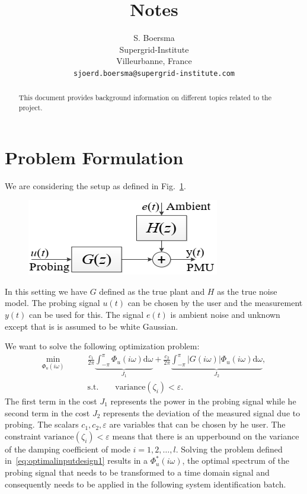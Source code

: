 \documentclass{article}
\title{Notes}
\author{
  S. Boersma\\ %
  Supergrid-Institute\\
  Villeurbanne, France \\
  \texttt{sjoerd.boersma@supergrid-institute.com} \\
}
\begin{document}
\maketitle

\begin{abstract}
	This document provides background information on different topics related to the project.
\end{abstract}



\section{Problem Formulation}
We are considering the setup as defined in Fig.~\ref{fig:setup}.


\begin{figure}[h]
	\centering
	\includegraphics[width=.5\linewidth]{Images/setup}
	\label{fig:setup}
\end{figure}

In this setting we have $G$ defined as the true plant and $H$ as the true noise model. The probing signal $u(t)$ can be chosen by the user and the measurement $y(t)$ can be used for this. The signal $e(t)$ is ambient noise and unknown except that is is assumed to be white Gaussian.   

We want to solve the following optimization problem:
\begin{equation}
\begin{aligned}
\min_{\Phi_u(i\omega)} \qquad & \frac{c_1}{2\pi} \underbrace{\int_{-\pi}^{\pi} \Phi_u(i\omega) \text{d}\omega}_{J_1} + \frac{c_2}{2\pi} \underbrace{\int_{-\pi}^{\pi} |G(i\omega)| \Phi_u(i\omega) \text{d}\omega}_{J_2}, \\
& \text{s.t.} \qquad \text{variance}(\zeta_i) < \varepsilon.
\label{eq:optimalinputdesign1}
\end{aligned}
\end{equation}
The first term in the cost $J_1$ represents the power in the probing signal while he second term in the cost $J_2$ represents the deviation of the measured signal due to probing. The scalars $c_1,c_2,\varepsilon$ are variables that can be chosen by he user. The constraint $\text{variance}(\zeta_i) < \varepsilon$ means that there is an upperbound on the variance of the damping coefficient of mode $i=1,2,\ldots,l$. Solving the problem defined in~\eqref{eq:optimalinputdesign1} results in a $\Phi^*_u(i\omega)$, the optimal spectrum of the probing signal that needs to be transformed to a time domain signal and consequently needs to be applied in the following system identification batch.    
\end{document}
